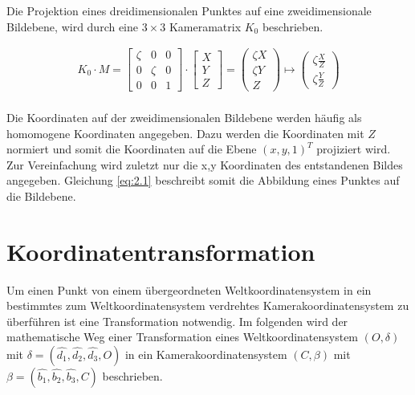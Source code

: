 Die Projektion eines dreidimensionalen Punktes auf eine zweidimensionale Bildebene, wird durch eine $3 \times 3$ Kameramatrix $K_0$ beschrieben. 

\begin{gather}
	K_0\cdot M =
	\begin{bmatrix}
		\zeta&0&0\\
		0&\zeta&0\\
		0&0&1
	\end{bmatrix}
	\cdot
	\begin{bmatrix}
		X\\Y\\Z
	\end{bmatrix}
	=
	\begin{pmatrix}
		\zeta X\\ \zeta Y\\ Z
	\end{pmatrix}
	\mapsto
	\begin{pmatrix}
		\zeta \frac{X}{Z}\\ \zeta \frac{Y}{Z}
	\end{pmatrix}
	\label{eq:2.1}
\end{gather}\\

Die Koordinaten auf der zweidimensionalen Bildebene werden häufig als homomogene Koordinaten angegeben. Dazu werden die Koordinaten mit $Z$ normiert und somit die Koordinaten auf die Ebene $(x,y,1)^T$ projiziert wird. Zur Vereinfachung wird zuletzt nur die x,y Koordinaten des entstandenen Bildes angegeben. Gleichung \ref{eq:2.1} beschreibt somit die Abbildung eines Punktes auf die Bildebene.

\section{Koordinatentransformation}

Um einen Punkt von einem übergeordneten Weltkoordinatensystem in ein bestimmtes zum Weltkoordinatensystem verdrehtes Kamerakoordinatensystem zu überführen ist eine Transformation notwendig. Im folgenden wird der mathematische Weg einer Transformation eines Weltkoordinatensystem $(O,\delta)$ mit $\delta = (\hat{d_1},\hat{d_2},\hat{d_3},O)$ in ein Kamerakoordinatensystem $(C,\beta)$ mit $\beta = (\hat{b_1},\hat{b_2},\hat{b_3},C)$ beschrieben.



